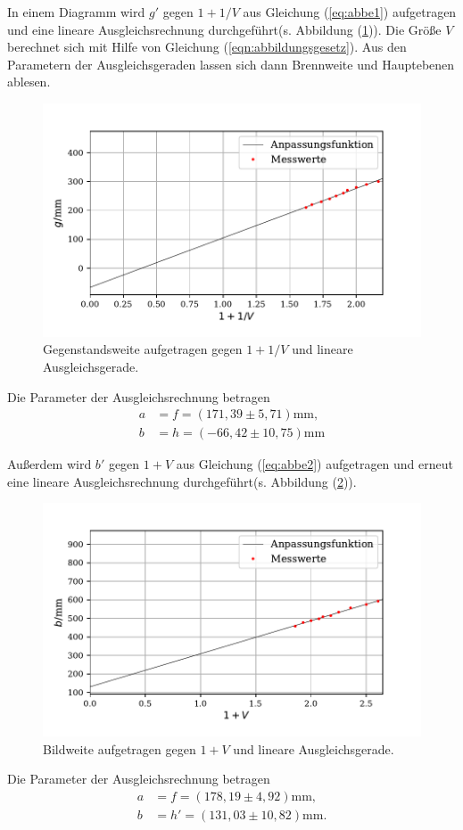 In einem Diagramm wird $g'$ gegen $1+1/V$ aus Gleichung (\ref{eq:abbe1}) aufgetragen und eine lineare Ausgleichsrechnung durchgeführt(s. Abbildung (\ref{fig:plot2})). Die Größe $V$ berechnet sich mit Hilfe von Gleichung (\ref{eqn:abbildungsgesetz}).
Aus den Parametern der Ausgleichsgeraden lassen sich dann Brennweite und Hauptebenen ablesen.
\begin{figure}[H]
  \centering
  \includegraphics{plot2.pdf}
  \caption{Gegenstandsweite aufgetragen gegen $1+1/V$ und lineare Ausgleichsgerade.}
  \label{fig:plot2}
\end{figure}
Die Parameter der Ausgleichsrechnung betragen
\begin{align*}
a &= f = (171,39 \pm 5,71)\si{\milli\meter},\\
b &= h = (-66,42\pm 10,75)\si{\milli\meter}
\end{align*}


\noindent Außerdem wird $b'$ gegen $1+V$ aus Gleichung (\ref{eq:abbe2}) aufgetragen und erneut eine lineare Ausgleichsrechnung durchgeführt(s. Abbildung (\ref{fig:plot3})).
\begin{figure}[H]
  \centering
  \includegraphics{plot3.pdf}
  \caption{Bildweite aufgetragen gegen $1+V$ und lineare Ausgleichsgerade.}
  \label{fig:plot3}
\end{figure}
Die Parameter der Ausgleichsrechnung betragen
\begin{align*}
a &= f = (178,19 \pm 4,92)\si{\milli\meter},\\
b &= h'= (131,03\pm 10,82)\si{\milli\meter}.
\end{align*}

